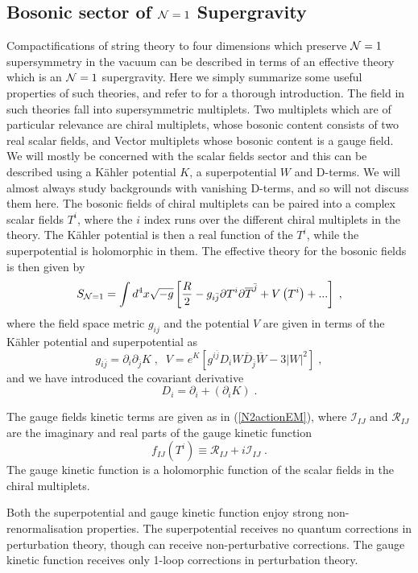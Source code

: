 \documentclass[11pt,a4paper]{article}
\numberwithin{equation}{section}
\numberwithin{table}{section}\setlength{\multlinegap}{25pt}
\newcommand{\cI}{\mathcal{I}}
\newcommand{\cR}{\mathcal{R}}
\newcommand{\be}{\begin{equation}}
\newcommand{\ee}{\end{equation}}
\begin{document}
\subsection{Bosonic sector of ${\cal N}=1$ Supergravity}

Compactifications of string theory to four dimensions which preserve ${\cal N}=1$ supersymmetry in the vacuum can be described in terms of an effective theory which is an ${\cal N}=1$ supergravity. Here we simply summarize some useful properties of such theories, and refer to \cite{Wess:1992cp} for a thorough introduction. The field in such theories fall into supersymmetric multiplets. Two multiplets which are of particular relevance are chiral multiplets, whose bosonic content consists of two real scalar fields, and Vector multiplets whose bosonic content is a gauge field. We will mostly be concerned with the scalar fields sector and this can be described using a K{\"a}hler potential $K$, a superpotential $W$ and D-terms. We will almost always study backgrounds with vanishing D-terms, and so will not discuss them here. The bosonic fields of chiral multiplets can be paired into a complex scalar fields $T^i$, where the $i$ index runs over the different chiral multiplets in the theory. The K{\"a}hler potential is then a real function of the $T^i$, while the superpotential is holomorphic in them. The effective theory for the bosonic fields is then given by
\be
S_{{\cal N}=1} = \int d^4 x \sqrt{-g}\left[ \frac{R}{2} - g_{i\bar{j}} \partial T^i \partial \overline{T}^{\bar{j}} + V\left(T^i \right) + ...\right] \;,
\ee
where the field space metric $g_{ij}$ and the potential $V$ are given in terms of the K{\"a}hler potential and superpotential as
\be
g_{i\bar{j}} = \partial_{i} \partial_{\bar{j}} K \;, \;\; 
V = e^{K} \left[ g^{i\bar{j}} D_i W \overline{D}_{\bar{j}} \overline{W}  - 3 \left|W\right|^2 \right] \;,
\label{gVfromKW}
\ee
and we have introduced the covariant derivative
\be
D_i = \partial_i + \left(\partial_i  K\right) \;.
\ee

The gauge fields kinetic terms are given as in (\ref{N2actionEM}), where $\cI_{IJ}$ and $\cR_{IJ}$ are the imaginary and real parts of the gauge kinetic function 
\be
f_{IJ}\left(T^i\right) \equiv \cR_{IJ} + i \cI_{IJ}  \;.
\ee
The gauge kinetic function is a holomorphic function of the scalar fields in the chiral multiplets. 

Both the superpotential and gauge kinetic function enjoy strong non-renormalisation properties. The superpotential receives no quantum corrections in perturbation theory, though can receive non-perturbative corrections. The gauge kinetic function receives only 1-loop corrections in perturbation theory. 
\end{document}
